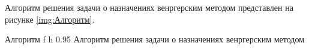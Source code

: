 




Алгоритм решения задачи о назначениях венргерским методом представлен на рисунке \ref{img:Алгоритм}.

\newpage

\thispagestyle{empty}

    {Алгоритм} %
    {f} %
    {h} %
    {0.95\textwidth} %
    {Алгоритм решения задачи о назначениях венргерским методом} %

